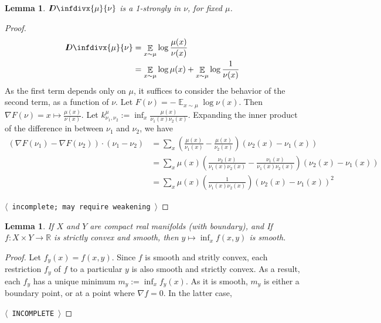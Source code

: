 \documentclass{article}
\theoremstyle{plain}
\newtheorem{lemma}[theorem]{Lemma}
\theoremstyle{definition}
\theoremstyle{remark}
\DeclareMathOperator*{\Ex}{\mathbb{E}} %
\newcommand{\thickD}{I\mkern-8muD}
\newcommand{\kldiv}{\thickD\infdivx}
\newcommand{\TODO}[1][INCOMPLETE]{{\centering\Large\color{red}$\langle$~\texttt{#1}~$\rangle$\par}}
\begin{document}
\begin{lemma} \label{lem:cvx3}
	$\kldiv{\mu}{\nu}$ is a 1-strongly in $\nu$, for fixed $\mu$. 
\end{lemma}
\begin{proof}
	\begin{align*}
		\kldiv{\mu}{\nu} &= \Ex_{x\sim\mu} \log \frac{\mu(x)}{\nu(x)} \\
			&= \Ex_{x \sim \mu}\log \mu(x) +  \Ex_{x\sim\mu}\log \frac{1}{\nu(x)}
	\end{align*}
	As the first term depends only on $\mu$, it suffices to consider the behavior
	of the second term, as a function of $\nu$. Let $F(\nu) = - \Ex_{x \sim \mu} \log \nu(x)$.
	Then $\nabla F(\nu) = x\mapsto \frac{\mu(x)}{\nu(x)}$. 
	Let $k^{\mu}_{\nu_1, \nu_2} := \inf_x \frac{\mu(x)}{\nu_1(x)\nu_2(x)}$. 
	Expanding the inner product of the difference in between $\nu_1$ and $\nu_2$, we have
	\begin{align*}
		(\nabla F(\nu_1) - \nabla F(\nu_2) ) \cdot (\nu_1 - \nu_2) 
			&= \sum_{x} \left( \frac{\mu(x)}{\nu_1(x)} - \frac{\mu(x)}{\nu_2(x)} \right)
				(\nu_2(x) - \nu_1(x)) \\
			&= \sum_{x} \mu(x) \left( \frac{\nu_2(x)}{\nu_1(x)\nu_2(x)} - 
				\frac{\nu_1(x)}{\nu_1(x) \nu_2(x)} \right) (\nu_2(x) - \nu_1(x)) \\
			&= \sum_{x} \mu(x) \left( \frac{1}{\nu_1(x)\nu_2(x)} \right)
			 (\nu_2(x) - \nu_1(x))^2
	\end{align*}
	\TODO[incomplete; may require weakening]
\end{proof}

\begin{lemma}\label{lem:cvx4}
	If $X$ and $Y$ are compact real manifolds (with boundary), and
	If $f : X \times Y \to \mathbb R$ is strictly convex and smooth,
	then $y\mapsto \inf_x f(x, y)$  is smooth.
\end{lemma}
\begin{proof}
	Let $f_y(x) = f(x,y)$. 
	Since $f$ is smooth and stritly convex, each restriction $f_y$ of $f$ to a 
	particular $y$ is also smooth and strictly convex. 
	As a result, each $f_y$ has a unique minimum $m_y := \inf_{x} f_y(x)$.
	As it is smooth, $m_y$ is either a boundary point, or
	at a point where $\nabla f = 0$. In the latter case, 
			
	\TODO
\end{proof}
\end{document}
